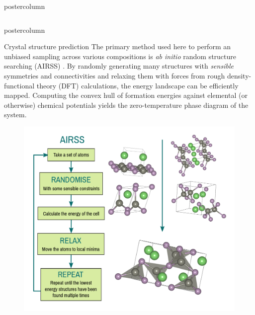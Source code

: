 \documentclass{beamer}
\begin{document}
\begin{frame}
\begin{columns}
\begin{column}{.57\textwidth}
\begin{beamercolorbox}[center]{postercolumn}
\begin{minipage}{.98\textwidth}
{\begin{columns}
\begin{column}{.48\textwidth}
\begin{beamercolorbox}[right]{postercolumn}
\begin{minipage}{\textwidth}
{\begin{myblock}{Crystal structure prediction}
              The primary method used here to perform  an unbiased sampling across various compositions is \emph{ab initio} random structure searching (AIRSS) \cite{Pickard2011}. By randomly generating many structures with \emph{sensible} symmetries and connectivities and relaxing them with forces from rough density-functional theory (DFT) calculations, the energy landscape can be efficiently mapped. Computing the convex hull of formation energies against elemental (or otherwise) chemical potentials yields the zero-temperature phase diagram of the system.
            \begin{figure}
                \centering
              \includegraphics[width=\textwidth]{img/airss.png}
          \end{figure}
              

\end{myblock}}
\end{minipage}
\end{beamercolorbox}
\end{column}
\end{columns}}
\end{minipage}
\end{beamercolorbox}
\end{column}
\end{columns}
\end{frame}
\end{document}
